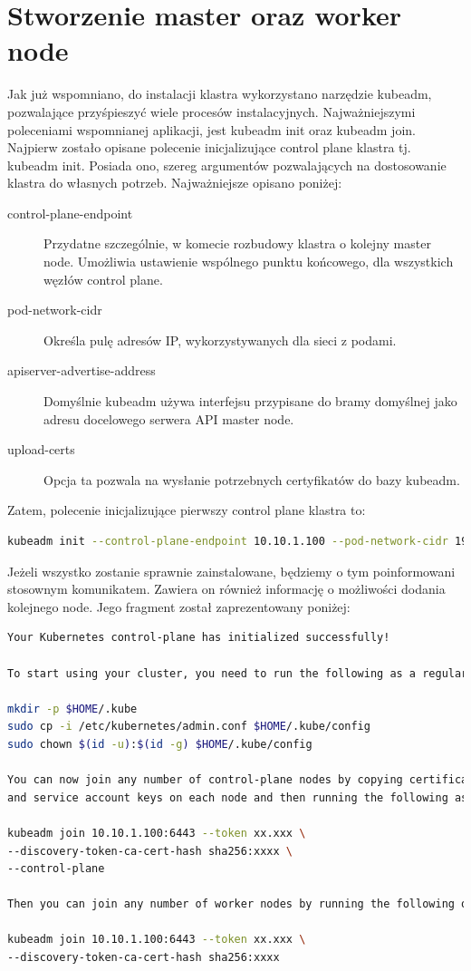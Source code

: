 \documentclass[pl,final,oneside]{mgr} %
\begin{document}
\section{Stworzenie master oraz worker node}
Jak już wspomniano, do instalacji klastra wykorzystano narzędzie kubeadm, pozwalające przyśpieszyć wiele procesów instalacyjnych. Najważniejszymi poleceniami wspomnianej aplikacji, jest kubeadm init oraz kubeadm join. Najpierw zostało opisane polecenie inicjalizujące control plane klastra tj. kubeadm init. Posiada ono, szereg argumentów pozwalających na dostosowanie klastra do własnych potrzeb. Najważniejsze opisano poniżej:
\begin{description}
	\item[control-plane-endpoint] Przydatne szczególnie, w komecie rozbudowy klastra o kolejny master node. Umożliwia ustawienie wspólnego punktu końcowego, dla wszystkich węzłów control plane.
	\item[pod-network-cidr] Określa pulę adresów IP, wykorzystywanych dla sieci z podami.
	\item[apiserver-advertise-address] Domyślnie kubeadm używa interfejsu przypisane do bramy domyślnej jako adresu docelowego serwera API master node.
	\item[upload-certs] Opcja ta pozwala na wysłanie potrzebnych certyfikatów do bazy kubeadm.
\end{description}
Zatem, polecenie inicjalizujące pierwszy control plane klastra to: 
\begin{lstlisting}[language=Bash]
kubeadm init --control-plane-endpoint 10.10.1.100 --pod-network-cidr 192.168.0.0/18 --apiserver-advertise-address 10.10.1.100 --upload-certs
\end{lstlisting}
Jeżeli wszystko zostanie sprawnie zainstalowane, będziemy o tym poinformowani stosownym komunikatem. Zawiera on również informację o możliwości dodania kolejnego node. Jego fragment został zaprezentowany poniżej:

\begin{lstlisting}[language=Bash]
Your Kubernetes control-plane has initialized successfully!

To start using your cluster, you need to run the following as a regular user:

mkdir -p $HOME/.kube
sudo cp -i /etc/kubernetes/admin.conf $HOME/.kube/config
sudo chown $(id -u):$(id -g) $HOME/.kube/config

You can now join any number of control-plane nodes by copying certificate authorities
and service account keys on each node and then running the following as root:

kubeadm join 10.10.1.100:6443 --token xx.xxx \
--discovery-token-ca-cert-hash sha256:xxxx \
--control-plane 

Then you can join any number of worker nodes by running the following on each as root:

kubeadm join 10.10.1.100:6443 --token xx.xxx \
--discovery-token-ca-cert-hash sha256:xxxx
\end{lstlisting}
\end{document}
